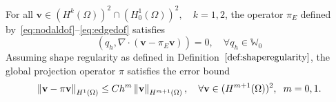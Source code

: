 \begin{lem}\label{lem:approximibility}
For all $\mathbf{v} \in (H^k(\Omega))^2 \cap (H^1_0(\Omega))^2,\quad k=1,2$,
the operator $\pi_E$ defined by~\eqref{eq:nodaldof}--\eqref{eq:edgedof} satisfies
\begin{equation}
(q_h, \nabla \cdot (\mathbf{v} - \pi_E \mathbf{v})) = 0, \quad \forall q_h \in \mathbb{W}_0
\end{equation}
Assuming shape regularity as defined in Definition~$\ref{def:shaperegularity}$, the 
global projection operator $\pi$ satisfies the 
error bound
\begin{equation}
\left\lVert\mathbf{v} - \pi \mathbf{v}\right\rVert_{H^1(\Omega)} \leq Ch^m\left\lVert\mathbf{v}\right\rVert_{H^{m+1}(\Omega)}, \quad \forall \mathbf{v} 
\in (H^{m+1}(\Omega))^2, \hspace{0.2cm} m=0,1.
\end{equation}
\end{lem}

